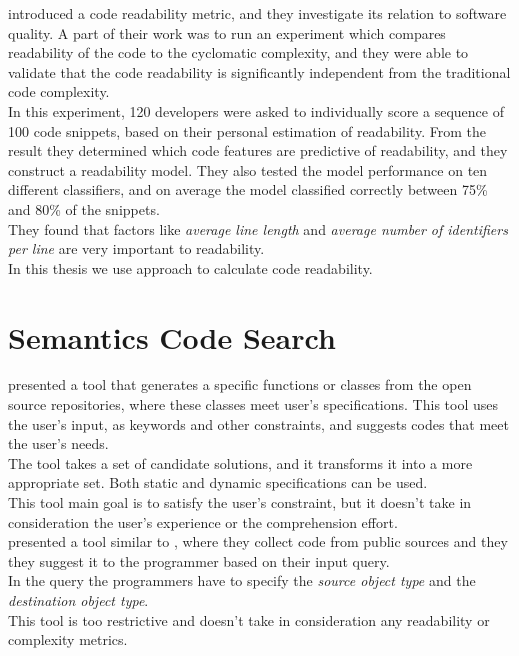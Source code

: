 \documentclass[12pt,mscthesis]{usiinfthesis}
\begin{document}
	\citet{Buse2010} introduced a code readability metric, and they investigate its relation to software quality. A part of their work was to run an experiment which compares readability of the code to the cyclomatic complexity, and they were able to validate that the code readability is significantly independent from the traditional code complexity.\\
	In this experiment, 120 developers were asked to individually score a sequence of 100 code snippets, based on their personal estimation of readability. From the result they determined which code features are predictive of readability, and they construct a readability model. They also tested the model performance on ten different classifiers, and on average the model classified correctly between 75\% and 80\% of the snippets.\\
	They found that factors like \textit{average line length} and \textit{average number of identifiers per line} are very important to readability.\\
	In this thesis we use \citep{Buse2010} approach to calculate code readability.

	\section{Semantics Code Search}

	\citep{Reiss:2009:SCS:1555001.1555040} presented a tool that generates a specific functions or classes from the open source repositories, where these classes meet user's specifications. This tool uses the user's input, as keywords and other constraints, and suggests codes that meet the user's needs.\\
	The tool takes a set of candidate solutions, and it transforms it into a more appropriate set. Both static and dynamic specifications can be used.\\
	This tool main goal is to satisfy the user's constraint, but it doesn't take in consideration the user's experience or the comprehension effort.\\
	

	\citep{Thummalapenta:2007:PPA:1321631.1321663} presented a tool similar to \citep{Reiss:2009:SCS:1555001.1555040}, where they collect code from public sources and they they suggest it to the programmer based on their input query.\\ In the query the programmers have to specify the \textit{source object type} and the \textit{destination object type}.\\ This tool is too restrictive and doesn't take in consideration any readability or complexity metrics.\\
\end{document}
